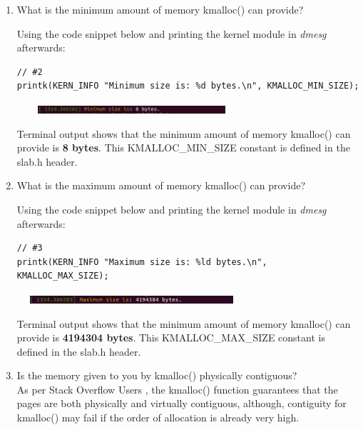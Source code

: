 \documentclass[conference]{IEEEtran}
\newcommand\tab[1][0.5cm]{\hspace*{#1}}
\begin{document}
\begin{enumerate}

\item What is the minimum amount of memory kmalloc() can provide?

\tab Using the code snippet below and printing the kernel module in \textit{dmesg} afterwards:
	\begin{lstlisting}
// #2
printk(KERN_INFO "Minimum size is: %d bytes.\n", KMALLOC_MIN_SIZE);
	\end{lstlisting}
	\begin{center}
		\includegraphics[width=8.5cm, height=0.3cm]{memory3.JPG}
	\end{center}
\tab Terminal output shows that the minimum amount of memory kmalloc() can provide is \textbf{8 bytes}. This KMALLOC\_MIN\_SIZE constant is defined in the slab.h header. \\

\item What is the maximum amount of memory kmalloc() can provide?

\tab Using the code snippet below and printing the kernel module in \textit{dmesg} afterwards:
\begin{lstlisting}
// #3
printk(KERN_INFO "Maximum size is: %ld bytes.\n", KMALLOC_MAX_SIZE);
\end{lstlisting}
\begin{center}
	\includegraphics[width=8.5cm, height=0.3cm]{memory4.JPG}
\end{center}
\tab Terminal output shows that the minimum amount of memory kmalloc() can provide is \textbf{4194304 bytes}. This KMALLOC\_MAX\_SIZE constant is defined in the slab.h header. \\

\item Is the memory given to you by kmalloc() physically contiguous? \\
\tab As per Stack Overflow Users \textcite{kmallocvsvmalloc}, the kmalloc() function guarantees that the pages are both physically and virtually contiguous, although, contiguity for kmalloc() may fail if the order of allocation is already very high.
\end{enumerate}
\end{document}
